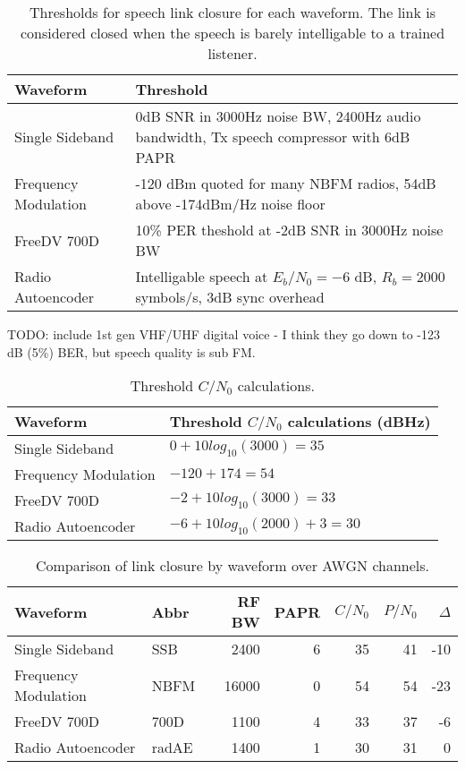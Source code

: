 \documentclass{article}
\begin{document}
\begin{table} [H]
\centering
\begin{tabular}{  m{3.5cm} | m{7cm}  }
 \hline
 Waveform             & Threshold \\
 \hline
 Single Sideband      & 0dB SNR in 3000Hz noise BW, 2400Hz audio bandwidth, Tx speech compressor with 6dB PAPR \\
 Frequency Modulation & -120 dBm quoted for many NBFM radios, 54dB above -174dBm/Hz noise floor \\
 FreeDV 700D          & 10\% PER theshold at -2dB SNR in 3000Hz noise BW \\
 Radio Autoencoder    & Intelligable speech at $E_b/N_0=-6$ dB, $R_b=2000$ symbols/s, 3dB sync overhead \\
 \hline
\end{tabular}
\caption{Thresholds for speech link closure for each waveform. The link is considered closed when the speech is barely intelligable to a trained listener.}
\label{tab:waveforms_thresh}
\end{table}

TODO: include 1st gen VHF/UHF digital voice - I think they go down to -123 dB (5\%) BER, but speech quality is sub FM.

\begin{table} [H]
\centering
\begin{tabular}{  m{3.5cm} | m{7cm}  }
 \hline
 Waveform             & Threshold $C/N_0$ calculations (dBHz) \\
 \hline
 Single Sideband      & $0 + 10log_{10}(3000) = 35$ \\
 Frequency Modulation & $-120 + 174 = 54$ \\
 FreeDV 700D          & $-2 + 10log_{10}(3000) = 33$ \\
 Radio Autoencoder    & $-6 + 10log_{10}(2000) + 3 = 30$ \\
 \hline
\end{tabular}
\caption{Threshold $C/N_0$ calculations.}
\label{tab:waveforms_thresh_calc}
\end{table}

\begin{table} [H]
\centering
\begin{tabular}{l l r r r r r}
 \hline
 Waveform             & Abbr  & RF BW & PAPR & $C/N_0$ & $P/N_0$ & $\Delta$ \\
 \hline
 Single Sideband      & SSB   & 2400  &  6 & 35 & 41 & -10 \\
 Frequency Modulation & NBFM  & 16000 &  0 & 54 & 54 & -23 \\
 FreeDV 700D          & 700D  & 1100  &  4 & 33 & 37 & -6  \\
 Radio Autoencoder    & radAE & 1400  &  1 & 30 & 31 &  0  \\
 \hline
\end{tabular}
\caption{Comparison of link closure by waveform over AWGN channels.}
\label{tab:waveforms_linkclosure}
\end{table}
\end{document}
